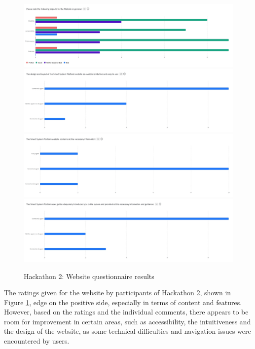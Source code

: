 \begin{figure}[H]
    \centering
    \includegraphics[width=\linewidth]{overleaf/images/website_rating.jpg}
    \includegraphics[width=\linewidth]{overleaf/images/website_use.jpg}
    \includegraphics[width=\linewidth]{overleaf/images/website_cvontent.jpg}
    \includegraphics[width=\linewidth]{overleaf/images/user_guide_use.jpg}
    \vspace{\ftspace}
    \caption{Hackathon 2: Website questionnaire results}
    \vspace{\ftspace}
    \label{fig:website_questions}
\end{figure}

The ratings given for the website by participants of Hackathon 2, shown in Figure \ref{fig:website_questions}, edge on the positive side, especially in terms of content and features. However, based on the ratings and the individual comments, there appears to be room for improvement in certain areas, such as accessibility, the intuitiveness and the design of the website, as some technical difficulties and navigation issues were encountered by users.

